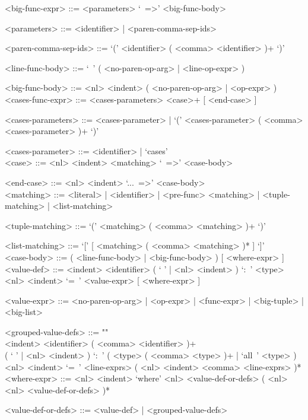 \documentclass{article}
\begin{document}
\begin{grammar}
<big-func-expr> ::= <parameters> `\ =>' <big-func-body>

<parameters> ::= <identifier> | <paren-comma-sep-ids>

<paren-comma-sep-ids> ::= `(' <identifier> ( <comma> <identifier> )+ `)'

<line-func-body> ::= `\ ' ( <no-paren-op-arg> | <line-op-expr> )

<big-func-body> ::= <nl> <indent> ( <no-paren-op-arg> | <op-expr> )
\\

<cases-func-expr> ::= <cases-parameters> <case>+ [ <end-case> ]

<cases-parameters> ::=
<cases-parameter> | `(' <cases-parameter> ( <comma> <cases-parameter> )+ `)'

<cases-parameter> ::= <identifier> | `cases'
\\

<case> ::=  <nl> <indent> <matching> `\ =>' <case-body>

<end-case> ::= <nl> <indent> `...\ =>' <case-body>
\\

<matching> ::= 
<literal> | <identifier> | <pre-func> <matching> | <tuple-matching> |
<list-matching>

<tuple-matching> ::= `(' <matching> ( <comma> <matching> )+ `)'

<list-matching> ::= `[' [ <matching> ( <comma> <matching> )* ] `]'
\\

<case-body> ::= ( <line-func-body> | <big-func-body> ) [ <where-expr> ]
\\

<value-def> ::= 
<indent> <identifier> 
( ` ' | <nl> <indent> ) `:\ ' <type> 
<nl> <indent> `=\ ' <value-expr> [ <where-expr> ]

<value-expr> ::=
<no-paren-op-arg> | <op-expr> | <func-expr> | <big-tuple> | <big-list>

<grouped-value-defs> ::= ""\\
<indent> <identifier> ( <comma> <identifier> )+ \\
( ` ' | <nl> <indent> ) `:\ ' ( <type> ( <comma> <type> )+ | `all\ ' <type> ) \\
<nl> <indent> `=\ ' <line-exprs> ( <nl> <indent> <comma> <line-exprs> )*
\\

<where-expr> ::=
<nl> <indent> `where' <nl> <value-def-or-defs> ( <nl> <nl> <value-def-or-defs> )*

<value-def-or-defs> ::= <value-def> | <grouped-value-defs> 
\end{grammar}
\end{document}
